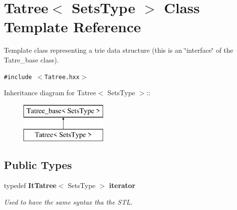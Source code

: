 \section{Tatree$<$ Sets\-Type $>$ Class Template Reference}
\label{class_tatree}
Template class representing a trie data structure (this is an \char`\"{}interface\char`\"{} of the Tatre\_\-base class).  


{\tt \#include $<$Tatree.hxx$>$}

Inheritance diagram for Tatree$<$ Sets\-Type $>$::\begin{figure}[H]
\begin{center}
\leavevmode
\includegraphics[height=2cm]{class_tatree}
\end{center}
\end{figure}
\subsection*{Public Types}
\begin{CompactItemize}
\item 
typedef {\bf It\-Tatree}$<$ Sets\-Type $>$ {\bf iterator}\label{class_tatree_06094a289a982269a29926e3f22b8356}

\begin{CompactList}\small\item\em Used to have the same syntax tha the STL. \item\end{CompactList}\end{CompactItemize}
